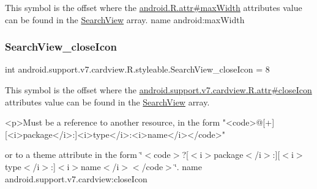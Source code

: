 This symbol is the offset where the \hyperlink{}{android.\+R.\+attr\#max\+Width} attribute\textquotesingle{}s value can be found in the \hyperlink{classandroid_1_1support_1_1v7_1_1cardview_1_1R_1_1styleable_a6a300ecad88f70a7642265f73ff4d33f}{Search\+View} array.  name android\+:max\+Width \mbox{\label{classandroid_1_1support_1_1v7_1_1cardview_1_1R_1_1styleable_a0cf54fb2b0b8469da1416f865524d537}} 
\subsubsection{\texorpdfstring{Search\+View\+\_\+close\+Icon}{SearchView\_closeIcon}}
{\footnotesize\ttfamily int android.\+support.\+v7.\+cardview.\+R.\+styleable.\+Search\+View\+\_\+close\+Icon = 8\hspace{0.3cm}{\ttfamily [static]}}

This symbol is the offset where the \hyperlink{classandroid_1_1support_1_1v7_1_1cardview_1_1R_1_1attr_a84d3fd2c43e781b002e7e4fe6d7d7d9d}{android.\+support.\+v7.\+cardview.\+R.\+attr\#close\+Icon} attribute\textquotesingle{}s value can be found in the \hyperlink{classandroid_1_1support_1_1v7_1_1cardview_1_1R_1_1styleable_a6a300ecad88f70a7642265f73ff4d33f}{Search\+View} array.

\begin{DoxyVerb}      <p>Must be a reference to another resource, in the form "<code>@[+][<i>package</i>:]<i>type</i>:<i>name</i></code>"
\end{DoxyVerb}
 or to a theme attribute in the form \char`\"{}$<$code$>$?\mbox{[}$<$i$>$package$<$/i$>$\+:\mbox{]}\mbox{[}$<$i$>$type$<$/i$>$\+:\mbox{]}$<$i$>$name$<$/i$>$$<$/code$>$\char`\"{}.  name android.\+support.\+v7.\+cardview\+:close\+Icon \mbox{\label{classandroid_1_1support_1_1v7_1_1cardview_1_1R_1_1styleable_a866623cc5ff182b4597adf1f4472b817}} 
